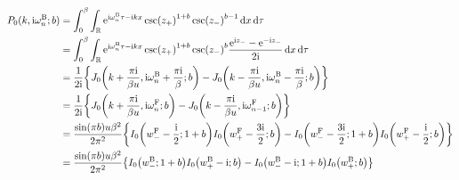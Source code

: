 \documentclass[english, parskip=full]{scrartcl}
\begin{document}
\begin{align}
P_0(k,\i\omega_n^\B;b) &= \intx{0}{\beta}{\intr{\powe{\i\omega_n^\B\tau - \i kx} \csc(z_+)^{1+b} \csc (z_-)^{b-1}}{x} }{\tau}\\
&= \intx{0}{\beta}{\intr{\powe{\i\omega_n^\B\tau - \i kx} \csc(z_+)^{1+b} \csc (z_-)^{b} \frac{\powe{\i z_-} - \powe{-\i z_-}}{2\i} }{x} }{\tau}\\
&= \frac{1}{2\i} \klc*{J_0\kla*{k + \frac{\pi\i}{\beta u}, \i\omega_n^\B + \frac{\pi\i}{\beta}; b} - J_0\kla*{k - \frac{\pi\i}{\beta u}, \i\omega_n^\B - \frac{\pi\i}{\beta}; b}}\\
&= \frac{1}{2\i} \klc*{J_0\kla*{k + \frac{\pi\i}{\beta u}, \i\omega_n^\F; b} - J_0\kla*{k - \frac{\pi\i}{\beta u}, \i\omega_{n-1}^\F; b}}\\
&= \frac{\sin(\pi b) u\beta^2}{2\pi^2} \klc*{I_0\kla*{w_-^\F - \frac{\i}{2}; 1+b} I_0\kla*{w_+^\F - \frac{3\i}{2}; b} - I_0\kla*{w_-^\F - \frac{3\i}{2}; 1+b} I_0\kla*{w_+^\F - \frac{\i}{2}; b}}\\
&= \frac{\sin(\pi b) u\beta^2}{2\pi^2} \klc*{I_0\kla*{w_-^\B; 1+b} I_0\kla*{w_+^\B- \i; b} - I_0\kla*{w_-^\B - \i; 1+b} I_0\kla*{w_+^\B; b}}
\end{align}
\end{document}
